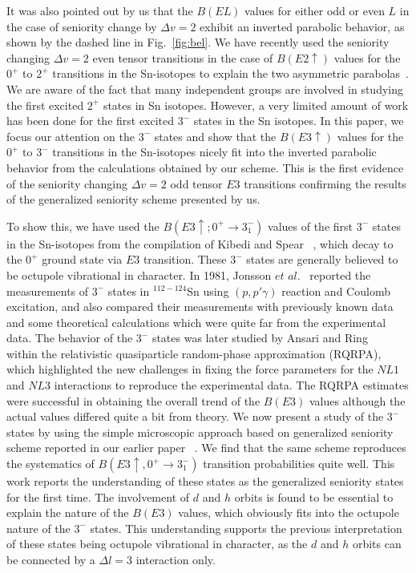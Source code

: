 \documentclass[twocolumn,showpacs,showkeys,preprintnumbers,amsmath,amssymb]{revtex4}
\begin{document}
It was also pointed out by us that the $B(EL)$ values for either odd or even $L$ in the case of seniority change by $\Delta v = 2$ exhibit an inverted parabolic behavior, as shown by the dashed line in Fig.~\ref{fig:bel}. We have recently used the seniority changing $\Delta v = 2$ even tensor transitions in the case of $B(E2 \uparrow)$ values for the $0^+$ to $2^+$ transitions in the Sn-isotopes to explain the two asymmetric parabolas~\cite{maheshwari2}. We are aware of the fact that many independent groups are involved in studying the first excited $2^+$ states in Sn isotopes. However, a very limited amount of work  has been done for the first excited $3^-$ states in the Sn isotopes. In this paper, we focus our attention on the $3^-$ states and show that the $B(E3 \uparrow)$ values for the $0^+$ to $3^-$ transitions in the Sn-isotopes nicely fit into the inverted parabolic behavior from the calculations obtained by our scheme. This is the first evidence of the seniority changing $\Delta v = 2$ odd tensor $E3$ transitions confirming the results of the generalized seniority scheme presented by us.

To show this, we have used the $B(E3 \uparrow;0^+ \rightarrow 3_1^-)$ values of the first $3^-$ states in the Sn-isotopes from the compilation of Kibedi and Spear ~\cite{kibedi}, which decay to the $0^+$ ground state via $E3$ transition. These $3^-$ states are generally believed to be octupole vibrational in character. In 1981, Jonsson $et$ $al.$~\cite{jonsson} reported the measurements of $3^-$ states in $^{112-124}$Sn using $(p,p' \gamma)$ reaction and Coulomb excitation, and also compared their measurements with previously known data and some theoretical calculations which were quite far from the experimental data. The behavior of the $3^-$ states was later studied by Ansari and Ring ~\cite{ansari} within the relativistic quasiparticle random-phase approximation (RQRPA), which highlighted the new challenges in fixing the force parameters for the $NL1$ and $NL3$ interactions to reproduce the experimental data. The RQRPA estimates were successful in obtaining the overall trend of the $B(E3)$ values although the actual values differed quite a bit from theory. We now present a study of the $3^-$ states by using the simple microscopic approach based on generalized seniority scheme reported in our earlier paper ~\cite{maheshwari1}. We find that the same scheme reproduces the systematics of $B(E3 \uparrow,0^+ \rightarrow 3_1^-)$ transition probabilities quite well. This work reports the understanding of these states as the generalized seniority states for the first time. The involvement of $d$ and $h$ orbits is found to be essential to explain the nature of the $B(E3)$ values, which obviously fits into the octupole nature of the $3^-$ states. This understanding supports the previous interpretation of these states being octupole vibrational in character, as the $d$ and $h$ orbits can be connected by a $\Delta l=3$ interaction only. 
\end{document}
